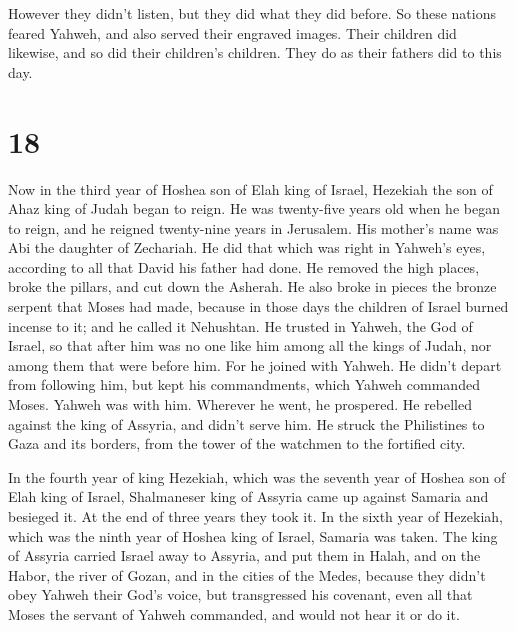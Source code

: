  However they didn't listen, but they did what they did
before.  So these nations feared Yahweh, and also served
their engraved images. Their children did likewise, and so did their
children's children. They do as their fathers did to this day.

\hypertarget{section-17}{%
\section{18}\label{section-17}}

 Now in the third year of Hoshea son of Elah king of
Israel, Hezekiah the son of Ahaz king of Judah began to reign.
 He was twenty-five years old when he began to reign, and
he reigned twenty-nine years in Jerusalem. His mother's name was Abi the
daughter of Zechariah.  He did that which was right in
Yahweh's eyes, according to all that David his father had done.
 He removed the high places, broke the pillars, and cut
down the Asherah. He also broke in pieces the bronze serpent that Moses
had made, because in those days the children of Israel burned incense to
it; and he called it Nehushtan.  He trusted in Yahweh, the
God of Israel, so that after him was no one like him among all the kings
of Judah, nor among them that were before him.  For he
joined with Yahweh. He didn't depart from following him, but kept his
commandments, which Yahweh commanded Moses.  Yahweh was
with him. Wherever he went, he prospered. He rebelled against the king
of Assyria, and didn't serve him.  He struck the
Philistines to Gaza and its borders, from the tower of the watchmen to
the fortified city.

 In the fourth year of king Hezekiah, which was the
seventh year of Hoshea son of Elah king of Israel, Shalmaneser king of
Assyria came up against Samaria and besieged it.  At the
end of three years they took it. In the sixth year of Hezekiah, which
was the ninth year of Hoshea king of Israel, Samaria was taken.
 The king of Assyria carried Israel away to Assyria, and
put them in Halah, and on the Habor, the river of Gozan, and in the
cities of the Medes,  because they didn't obey Yahweh
their God's voice, but transgressed his covenant, even all that Moses
the servant of Yahweh commanded, and would not hear it or do it.

